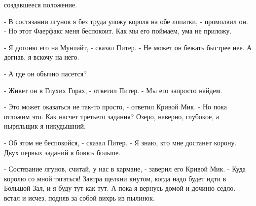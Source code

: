 создавшееся положение.
\par- В состязании лгунов я без труда уложу короля на обе лопатки, - 
промолвил он. - Но этот Фаерфакс меня беспокоит. Как мы его поймаем, 
ума не приложу.
\par- Я догоню его на Мунлайт, - сказал Питер. - Не может он бежать 
быстрее нее. А догнав, я вскочу на него.
\par- А где он обычно пасется?
\par- Живет он в Глухих Горах, - ответил Питер. - Мы его запросто 
найдем.
\par- Это может оказаться не так-то просто, - ответил Кривой Мик. - Но 
пока отложим это. Как насчет третьего задания? Озеро, наверно, 
глубокое, а ныряльщик я никудышний.
\par- Об этом не беспокойся, - сказал Питер. - Я знаю, кто мне 
достанет корону. Двух первых заданий я боюсь больше.
\par- Состязание лгунов, считай, у нас в кармане, - заверил его Кривой 
Мик. - Куда королю со мной тягаться! Завтра щелкни кнутом, когда надо 
будет идти в Большой Зал, и я буду тут как тут. А пока я вернусь домой 
и дочиню седло.
 встал и исчез, подняв за собой вихрь из пылинок.
